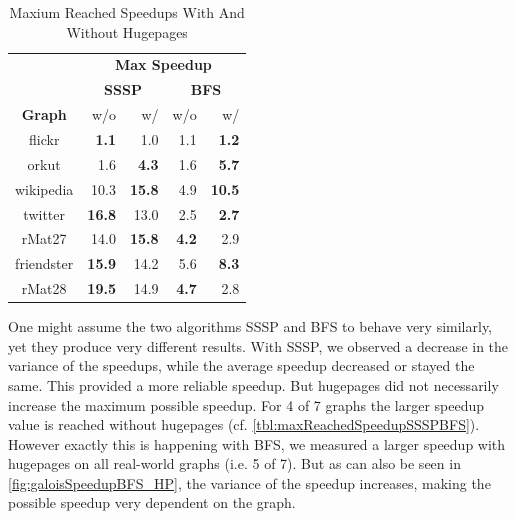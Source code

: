 \begin{table}
	\caption{Maxium Reached Speedups With And Without Hugepages}
	\label{tbl:maxReachedSpeedupSSSPBFS}
	\renewcommand{\arraystretch}{1.3}
	\centering
	\begin{tabular}{cr@{\tabskip 2 \tabcolsep}rr@{\tabskip 2 \tabcolsep}r}
		\toprule
		&\multicolumn{4}{c}{\bf Max Speedup}\\
		&\multicolumn{2}{c}{\bf SSSP}&\multicolumn{2}{c}{\bf BFS}\\
		\cmidrule{2-3}\cmidrule{4-5}
		\bf Graph & w/o & w/&w/o&w/\\
		\midrule
		flickr & \bf 1.1 &  1.0 & 1.1 & \bf 1.2 \\
		orkut & 1.6 & \bf 4.3 & 1.6 & \bf 5.7 \\
		wikipedia & 10.3 & \bf 15.8 & 4.9 & \bf 10.5 \\
		twitter & \bf 16.8 &  13.0 & 2.5 & \bf 2.7 \\
		rMat27 & 14.0 & \bf 15.8 & \bf 4.2 & 2.9 \\
		friendster & \bf 15.9 &  14.2 & 5.6 & \bf 8.3 \\
		rMat28 & \bf 19.5 &  14.9 & \bf 4.7 & 2.8 \\
		\bottomrule
	\end{tabular}
\end{table}
One might assume the two algorithms SSSP and BFS to behave very similarly, yet they produce very different results. 
With SSSP, we observed a decrease in the variance of the speedups, while the average speedup decreased or stayed the same. This provided a more reliable speedup. 
But hugepages did not necessarily increase the maximum possible speedup. For 4 of 7 graphs the larger speedup value is reached without hugepages (cf. \autoref{tbl:maxReachedSpeedupSSSPBFS}).
However exactly this is happening with BFS, we measured a larger speedup with hugepages on all real-world graphs (i.e. 5 of 7).
But as can also be seen in \autoref{fig:galoisSpeedupBFS_HP}, the variance of the speedup increases, making the possible speedup very dependent on the graph.




